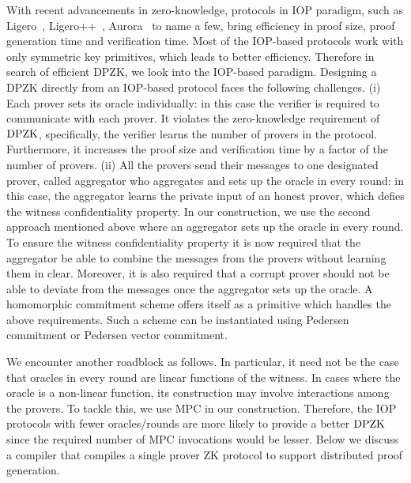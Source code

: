 With recent advancements in zero-knowledge, protocols in IOP paradigm, such as Ligero~\cite{ligero}, Ligero++~\cite{ligero++}, Aurora~\cite{aurora} to name a few, bring efficiency in proof size, proof generation time and verification time. Most of the IOP-based protocols work with only symmetric key primitives, which leads to better efficiency. Therefore in search of efficient DPZK, we look into the IOP-based paradigm. Designing a DPZK directly from an IOP-based protocol faces the following challenges. (i) Each prover sets its oracle individually: in this case the verifier is required to communicate with each prover. It violates the zero-knowledge requirement of $\text{DPZK}$, specifically, the verifier learns the number of provers in the protocol. Furthermore, it increases the proof size and verification time by a factor of the number of provers. (ii) All the provers send their messages to one designated prover, called aggregator who aggregates and sets up the oracle in every round: in this case, the aggregator learns the private input of an honest prover, which defies the witness confidentiality property. 
In our construction, we use the second approach mentioned above where an aggregator sets up the oracle in every round. To ensure the witness confidentiality property it is now required that the aggregator be able to combine the messages from the provers without learning them in clear. Moreover, it is also required that a corrupt prover should not be able to deviate from the messages once the aggregator sets up the oracle. A homomorphic commitment scheme offers itself as a primitive which handles the above requirements. Such a scheme can be instantiated using Pedersen commitment or Pedersen vector commitment.

We encounter another roadblock as follows. In particular, it need not be the case that oracles in every round are linear functions of the witness. In cases where the oracle is a non-linear function, its construction may involve interactions among the provers. To tackle this, we use MPC in our construction. Therefore, the IOP protocols with fewer oracles/rounds are more likely to provide a better $\text{DPZK}$ since the required number of MPC invocations would be lesser. Below we discuss a compiler that compiles a
single prover ZK protocol to support distributed proof generation.  

